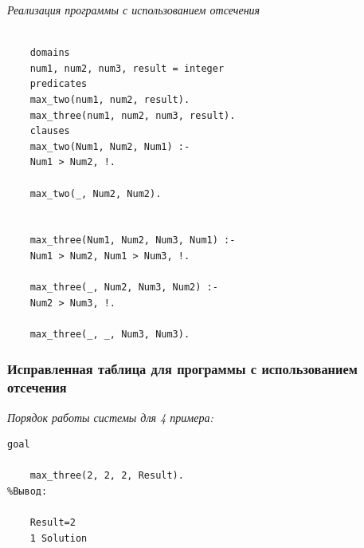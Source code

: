 \documentclass[a4paper,12pt]{article}
\begin{document}
	\textit{Реализация программы с использованием отсечения}
	
	\begin{verbatim}
	
	domains
	num1, num2, num3, result = integer
	predicates
	max_two(num1, num2, result).
	max_three(num1, num2, num3, result).
	clauses
	max_two(Num1, Num2, Num1) :-
	Num1 > Num2, !.
	
	max_two(_, Num2, Num2).
	
	
	max_three(Num1, Num2, Num3, Num1) :-
	Num1 > Num2, Num1 > Num3, !.
	
	max_three(_, Num2, Num3, Num2) :-
	Num2 > Num3, !.
	
	max_three(_, _, Num3, Num3).
	\end{verbatim}
	
	\subsubsection*{Исправленная таблица для программы с использованием отсечения}
	
	\textit{Порядок работы системы для 4 примера:}
	
	\begin{verbatim}
goal
	
	max_three(2, 2, 2, Result).
%Вывод:
	
	Result=2
	1 Solution
	\end{verbatim}
	
\end{document}
